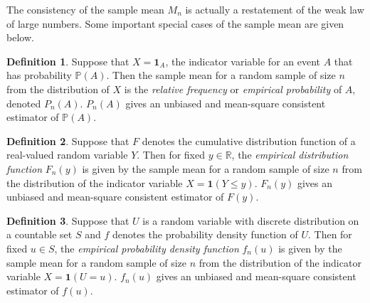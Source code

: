 \documentclass[a4paper,12pt]{article}
\theoremstyle{definition}
\theoremstyle{definition}
\theoremstyle{definition}
\newtheorem{definition}{Definition}[section]
\begin{document}
    The consistency of the sample mean $M_n$ is actually a restatement of the weak law of large numbers. Some important special cases of the sample mean are given below.
    \begin{definition}
        Suppose that $X = \mathbf{1}_A$, the indicator variable for an event $A$ that has probability $\mathbb{P}(A)$. Then the sample mean for a random sample of size $n$ from the distribution of $X$ is the \textit{relative frequency} or \textit{empirical probability} of $A$, denoted $P_n(A)$. $P_n(A)$ gives an unbiased and mean-square consistent estimator of $\mathbb{P}(A)$.
    \end{definition}
    \begin{definition}
        Suppose that $F$ denotes the cumulative distribution function of a real-valued random variable $Y$. Then for fixed $y \in \mathbb{R}$, the \textit{empirical distribution function} $F_n(y)$ is given by the sample mean for a random sample of size $n$ from the distribution of the indicator variable $X = \mathbf{1}(Y \leq y)$. $F_n(y)$ gives an unbiased and mean-square consistent estimator of $F(y)$.
    \end{definition}
    \begin{definition}
        Suppose that $U$ is a random variable with discrete distribution on a countable set $S$ and $f$ denotes the probability density function of $U$. Then for fixed $u \in S$, the \textit{empirical probability density function} $f_n(u)$ is given by the sample mean for a random sample of size $n$ from the distribution of the indicator variable $X = \mathbf{1}(U = u)$. $f_n(u)$ gives an unbiased and mean-square consistent estimator of $f(u)$.
    \end{definition}
\end{document}

